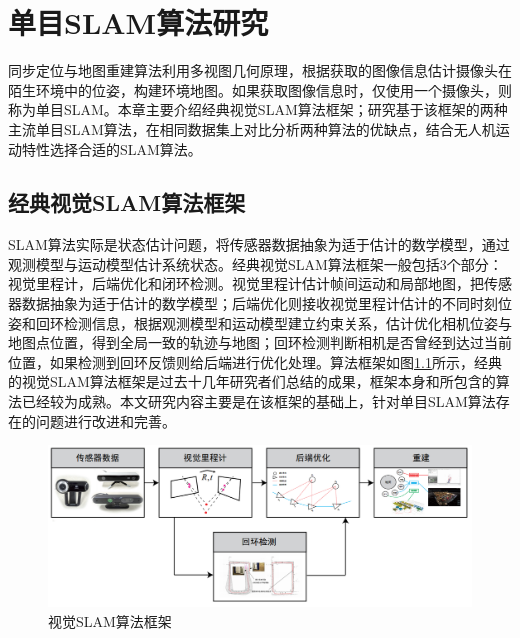 
\chapter{单目SLAM算法研究}
\label{chap:ALGORITHM}

同步定位与地图重建算法利用多视图几何原理\upcite{[]}，根据获取的图像信息估计摄像头在陌生环境中的位姿，构建环境地图。如果获取图像信息时，仅使用一个摄像头，则称为单目SLAM。本章主要介绍经典视觉SLAM算法框架；研究基于该框架的两种主流单目SLAM算法，在相同数据集上对比分析两种算法的优缺点，结合无人机运动特性选择合适的SLAM算法。

\section{经典视觉SLAM算法框架}
SLAM算法实际是状态估计问题，将传感器数据抽象为适于估计的数学模型，通过观测模型与运动模型估计系统状态。经典视觉SLAM算法框架一般包括3个部分：视觉里程计，后端优化和闭环检测。视觉里程计估计帧间运动和局部地图，把传感器数据抽象为适于估计的数学模型；后端优化则接收视觉里程计估计的不同时刻位姿和回环检测信息，根据观测模型和运动模型建立约束关系，估计优化相机位姿与地图点位置，得到全局一致的轨迹与地图；回环检测判断相机是否曾经到达过当前位置，如果检测到回环反馈则给后端进行优化处理。算法框架如图\ref{fig3.1}所示，经典的视觉SLAM算法框架是过去十几年研究者们总结的成果，框架本身和所包含的算法已经较为成熟。本文研究内容主要是在该框架的基础上，针对单目SLAM算法存在的问题进行改进和完善。
\begin{figure}[h]
\centering
\includegraphics[scale=0.3]{figures/Fig3.1.png}
\caption{视觉SLAM算法框架}
\label{fig3.1}
\end{figure}

